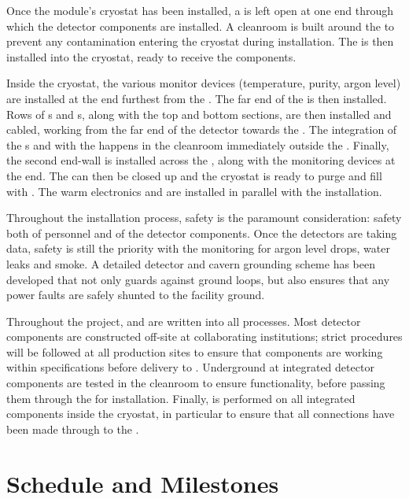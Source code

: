 Once the module's cryostat has been installed, a  is left open at one end through which the detector components are installed. A cleanroom is built around the  to prevent any contamination entering the cryostat during installation. The  is then installed into the cryostat, ready to receive the  components. 

Inside the cryostat, the various monitor devices (temperature, purity, argon level) are installed at the end furthest from the . The far end of the  is then installed. Rows of s and s, along with the top and bottom  sections, are then installed and cabled, working from the far end of the detector towards the . The integration of the s and  with the  happens in the cleanroom immediately outside the . Finally, the second  end-wall is installed across the , along with the monitoring devices at the  end. The  can then be closed up and the cryostat is ready to purge and fill with . The warm electronics and  are installed in parallel with the  installation.

Throughout the installation process, safety is the paramount consideration: safety both of personnel and of the detector components. Once the detectors are taking data, safety is still the priority with the  monitoring for argon level drops, water leaks and smoke. A detailed detector and cavern grounding scheme has been developed that not only guards against ground loops, but also ensures that any power faults are safely shunted to the facility ground.

Throughout the project,  and  are written into all processes. Most detector components are constructed off-site at collaborating institutions; strict  procedures will be followed at all production sites to ensure that components are working within specifications before delivery to . Underground at  integrated detector components are tested in the cleanroom to ensure functionality, before passing them through the  for installation. Finally,  is performed on all integrated components inside the cryostat, in particular to ensure that all connections have been made through to the .

\section{Schedule and Milestones}
\label{sec:fdsp-exec-sched}


